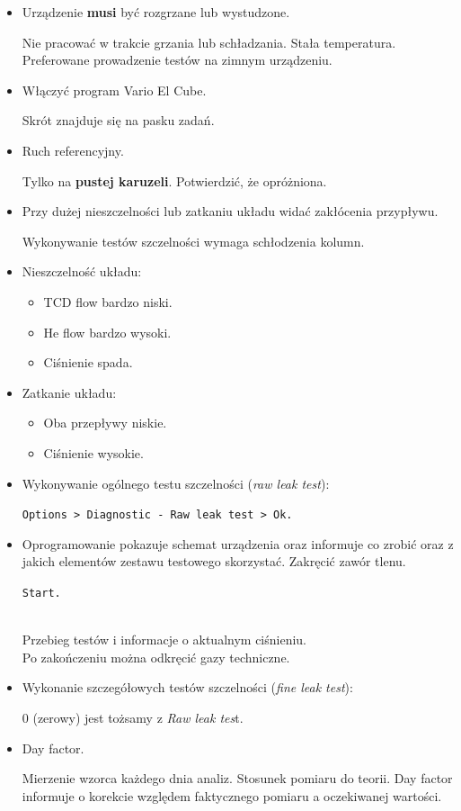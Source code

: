 \documentclass[
  letterpaper,
  DIV=11,
  numbers=noendperiod]{scrreprt}
\begin{document}
\begin{itemize}
\item
  Urządzenie \textbf{musi} być rozgrzane lub wystudzone.

  Nie pracować w trakcie grzania lub schładzania. Stała temperatura.
  Preferowane prowadzenie testów na zimnym urządzeniu.
\item
  Włączyć program Vario El Cube.

  Skrót znajduje się na pasku zadań.
\item
  Ruch referencyjny.

  Tylko na \textbf{pustej karuzeli}. Potwierdzić, że opróżniona.
\item
  Przy dużej nieszczelności lub zatkaniu układu widać zakłócenia
  przypływu.

  Wykonywanie testów szczelności wymaga schłodzenia kolumn.
\item
  Nieszczelność układu:

  \begin{itemize}
  \item
    TCD flow bardzo niski.
  \item
    He flow bardzo wysoki.
  \item
    Ciśnienie spada.
  \end{itemize}
\item
  Zatkanie układu:

  \begin{itemize}
  \item
    Oba przepływy niskie.
  \item
    Ciśnienie wysokie.
  \end{itemize}
\item
  Wykonywanie ogólnego testu szczelności (\emph{raw leak test}):

  \texttt{Options\ \textgreater{}\ Diagnostic\ -\ Raw\ leak\ test\ \textgreater{}\ Ok.}
\item
  Oprogramowanie pokazuje schemat urządzenia oraz informuje co zrobić
  oraz z jakich elementów zestawu testowego skorzystać. Zakręcić zawór
  tlenu.

  \texttt{Start.}\strut \\
  Przebieg testów i informacje o aktualnym ciśnieniu.\\
  Po zakończeniu można odkręcić gazy techniczne.
\item
  Wykonanie szczegółowych testów szczelności (\emph{fine leak test}):

  0 (zerowy) jest tożsamy z \emph{Raw leak tes}t.
\item
  Day factor.

  Mierzenie wzorca każdego dnia analiz. Stosunek pomiaru do teorii. Day
  factor informuje o korekcie względem faktycznego pomiaru a oczekiwanej
  wartości.
\end{itemize}
\end{document}
